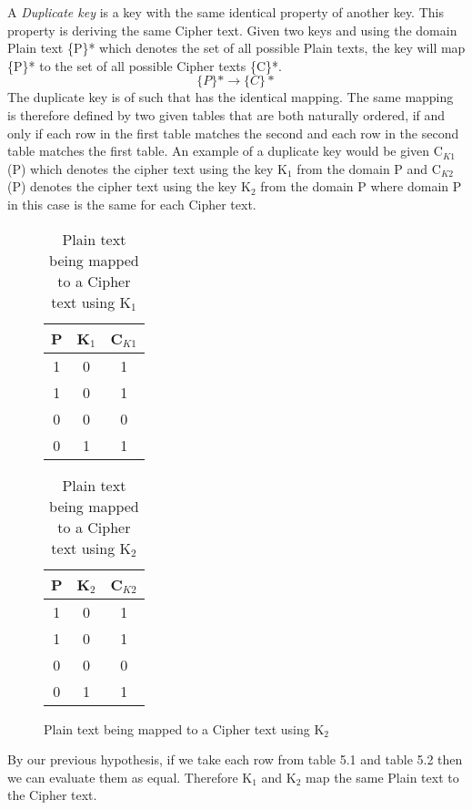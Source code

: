 \documentclass[11pt,a4paper]{report}
\begin{document}
 A \emph{Duplicate key} is a key with the same identical property of another key. This property is deriving the same Cipher text. Given two keys and using the domain Plain text \{P\}* which denotes the set of all possible Plain texts, the key will map \{P\}* to the set of all possible Cipher texts \{C\}*.
 \begin{displaymath}
 \{P\}* \rightarrow \{C\}*
 \end{displaymath}
 The duplicate key is of such that has the identical mapping. The same mapping is therefore defined by two given tables that are both naturally ordered, if and only if each row in the first table matches the second and each row in the second table matches the first table.
 An example of a duplicate key would be given C$_{K1}$(P) which denotes the cipher text using the key K$_1$ from the domain P and C$_{K2}$(P) denotes the cipher text using the key K$_2$ from the domain P where domain P in this case is the same for each Cipher text.


\begin{figure}
\begin{table}[H]
\centering
\label{tab:C1}
\begin{tabular}{|c|c|c|}
\hline
P & K$_1$ & C$_{K1}$ \\ \hline
1 & 0 & 1 \\
1 & 0 & 1 \\
0 & 0 & 0 \\
0 & 1 & 1 \\
\hline
\end{tabular}
\caption{Plain text being mapped to a Cipher text using K$_1$}
\end{table}

\begin{table}[H]
\centering
\label{tab:C2}
\begin{tabular}{|c|c|c|}
\hline
P & K$_2$ & C$_{K2}$ \\ \hline
1 & 0 & 1 \\
1 & 0 & 1 \\
0 & 0 & 0 \\
0 & 1 & 1 \\
\hline
\end{tabular}
\caption{Plain text being mapped to a Cipher text using K$_2$}
\end{table}
\end{figure}

By our previous hypothesis, if we take each row from table 5.1 and table 5.2 then we can evaluate them as equal. Therefore K$_1$ and K$_2$ map the same Plain text to the Cipher text.
\end{document}
